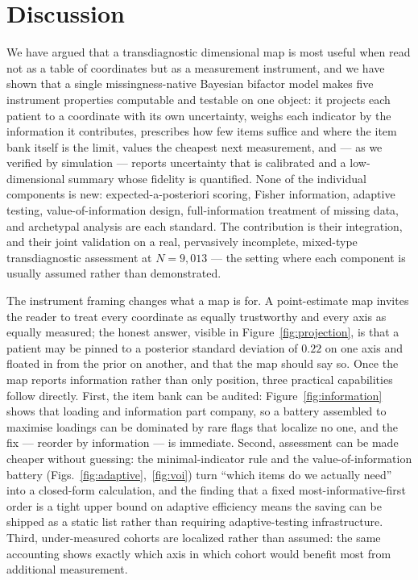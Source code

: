 \section{Discussion}

We have argued that a transdiagnostic dimensional map is most useful when read not
as a table of coordinates but as a measurement instrument, and we have shown that a
single missingness-native Bayesian bifactor model makes five instrument properties
computable and testable on one object: it projects each patient to a coordinate
with its own uncertainty, weighs each indicator by the information it contributes,
prescribes how few items suffice and where the item bank itself is the limit,
values the cheapest next measurement, and --- as we verified by simulation ---
reports uncertainty that is calibrated and a low-dimensional summary whose fidelity
is quantified. None of the individual components is new: expected-a-posteriori
scoring, Fisher information, adaptive testing, value-of-information design,
full-information treatment of missing data, and archetypal analysis are each
standard. The contribution is their integration, and their joint validation on a
real, pervasively incomplete, mixed-type transdiagnostic assessment at $N=9{,}013$
--- the setting where each component is usually assumed rather than demonstrated.

The instrument framing changes what a map is for. A point-estimate map invites the
reader to treat every coordinate as equally trustworthy and every axis as equally
measured; the honest answer, visible in Figure~\ref{fig:projection}, is that a
patient may be pinned to a posterior standard deviation of $0.22$ on one axis and
floated in from the prior on another, and that the map should say so. Once the map
reports information rather than only position, three practical capabilities follow
directly. First, the item bank can be audited: Figure~\ref{fig:information} shows
that loading and information part company, so a battery assembled to maximise
loadings can be dominated by rare flags that localize no one, and the fix ---
reorder by information --- is immediate. Second, assessment can be made cheaper
without guessing: the minimal-indicator rule and the value-of-information battery
(Figs.~\ref{fig:adaptive},~\ref{fig:voi}) turn ``which items do we actually need''
into a closed-form calculation, and the finding that a fixed most-informative-first
order is a tight upper bound on adaptive efficiency means the saving can be shipped
as a static list rather than requiring adaptive-testing infrastructure. Third,
under-measured cohorts are localized rather than assumed: the same accounting shows
exactly which axis in which cohort would benefit most from additional measurement.

